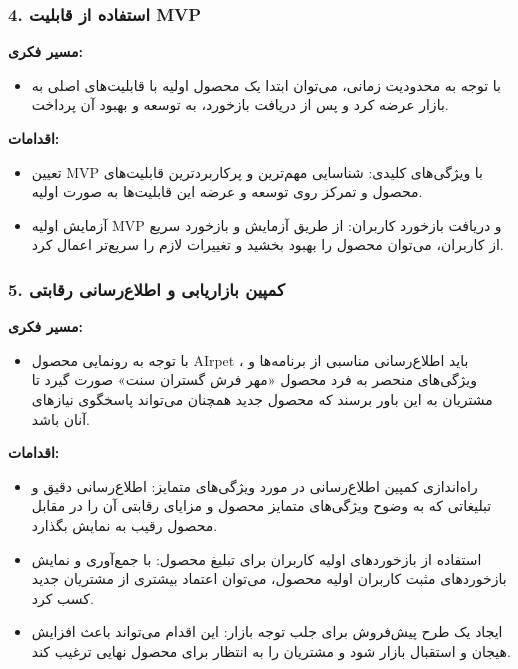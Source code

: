 \subsubsection*{4. استفاده از قابلیت MVP}

\textbf{مسیر فکری:}
\begin{itemize}
    \item با توجه به محدودیت زمانی، می‌توان ابتدا یک محصول اولیه با قابلیت‌های اصلی به بازار عرضه کرد و پس از دریافت بازخورد، به توسعه و بهبود آن پرداخت.
\end{itemize}

\textbf{اقدامات:}

\begin{itemize}
    \item تعیین MVP با ویژگی‌های کلیدی: شناسایی مهم‌ترین و پرکاربردترین قابلیت‌های محصول و تمرکز روی توسعه و عرضه این قابلیت‌ها به صورت اولیه.
    \item آزمایش اولیه MVP و دریافت بازخورد کاربران: از طریق آزمایش و بازخورد سریع از کاربران، می‌توان محصول را بهبود بخشید و تغییرات لازم را سریع‌تر اعمال کرد.
\end{itemize}


\subsubsection*{5. کمپین بازاریابی و اطلاع‌رسانی رقابتی}

\textbf{مسیر فکری:}

\begin{itemize}
    \item با توجه به رونمایی محصول AIrpet ، باید اطلاع‌رسانی مناسبی از برنامه‌ها و ویژگی‌های منحصر به فرد محصول «مهر فرش گستران سنت» صورت گیرد تا مشتریان به این باور برسند که محصول جدید همچنان می‌تواند پاسخگوی نیازهای آنان باشد.
\end{itemize}

\textbf{اقدامات:}

\begin{itemize}
    \item راه‌اندازی کمپین اطلاع‌رسانی در مورد ویژگی‌های متمایز: اطلاع‌رسانی دقیق و تبلیغاتی که به وضوح ویژگی‌های متمایز محصول و مزایای رقابتی آن را در مقابل محصول رقیب به نمایش بگذارد.
    \item استفاده از بازخوردهای اولیه کاربران برای تبلیغ محصول: با جمع‌آوری و نمایش بازخوردهای مثبت کاربران اولیه محصول، می‌توان اعتماد بیشتری از مشتریان جدید کسب کرد.
    \item ایجاد یک طرح پیش‌فروش برای جلب توجه بازار: این اقدام می‌تواند باعث افزایش هیجان و استقبال بازار شود و مشتریان را به انتظار برای محصول نهایی ترغیب کند.
\end{itemize}


